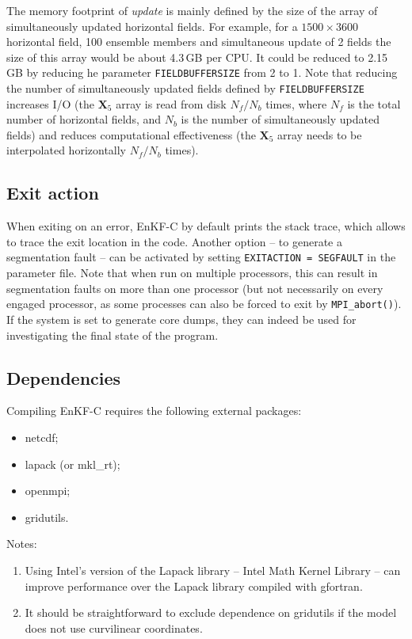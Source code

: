 \documentclass[11pt]{report}
\newcommand{\mb} {\mathbf}
\begin{document}
The memory footprint of \emph{update} is mainly defined by the size of the array of simultaneously updated horizontal fields.
For example, for a $1500 \times 3600$ horizontal field, 100 ensemble members and simultaneous update of 2 fields the size of this array would be about 4.3\,GB per CPU.
It could be reduced to 2.15\,GB by reducing he parameter \verb|FIELDBUFFERSIZE| from 2 to 1.
Note that reducing the number of simultaneously updated fields defined by \verb|FIELDBUFFERSIZE| increases I/O (the $\mb X_5$ array is read from disk $N_f / N_b$ times, where $N_f$ is the total number of horizontal fields, and $N_b$ is the number of simultaneously updated fields) and reduces computational effectiveness (the $\mb X_5$ array needs to be interpolated horizontally $N_f / N_b$ times).

\subsection{Exit action}

When exiting on an error, EnKF-C by default prints the stack trace, which allows to trace the exit location in the code.
Another option -- to generate a segmentation fault -- can be activated by setting \verb|EXITACTION = SEGFAULT| in the parameter file.
Note that when run on multiple processors, this can result in segmentation faults on more than one processor (but not necessarily on every engaged processor, as some processes can also be forced to exit by \verb|MPI_abort()|).
If the system is set to generate core dumps, they can indeed be used for investigating the final state of the program.

\subsection{Dependencies}

Compiling EnKF-C requires the following external packages:

\begin{itemize}
\item netcdf;
\item lapack (or mkl\_rt);
\item openmpi;
\item gridutils.
\end{itemize}

Notes:
\begin{enumerate}
\item Using Intel's version of the Lapack library -- Intel Math Kernel Library -- can improve performance over the Lapack library compiled with gfortran.
\item It should be straightforward to exclude dependence on gridutils if the model does not use curvilinear coordinates.
\end{enumerate}
\end{document}
